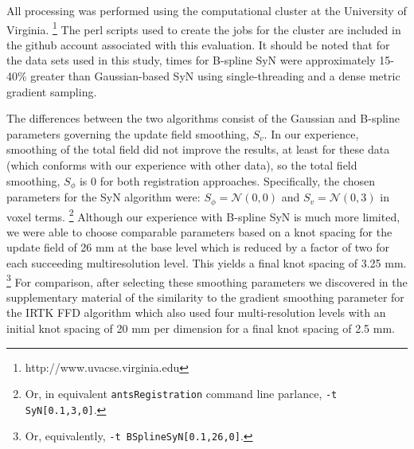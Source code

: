 \documentclass{frontiersSCNS}
\begin{document}
All processing was performed using the computational cluster at the 
University of Virginia.%
\footnote{
http://www.uvacse.virginia.edu
}
The perl scripts used to create the jobs for the cluster are
included in the github account associated with this evaluation.  
It should be noted that for the
data sets used in this study, times for B-spline SyN were approximately 
15-40\% greater than Gaussian-based SyN using single-threading and a dense
metric gradient sampling.

The differences between the two algorithms consist of the Gaussian and 
B-spline parameters governing the update field smoothing, $S_v$.  In our 
experience, smoothing of the total field did not improve the results, at
least for these data (which conforms with our experience with other
data), so the total field smoothing, $S_{\phi}$ is 0 for
both registration approaches.  Specifically, the chosen parameters
for the SyN algorithm were:  $S_{\phi} = \mathcal{N}(0,0)$ and 
$S_{v} = \mathcal{N}(0,3)$ in voxel terms.%
\footnote{
 Or, in equivalent {\tt antsRegistration} command line parlance, {\tt -t
 SyN[0.1,3,0]}.
 }  Although our experience with B-spline SyN is much more limited, we 
were able to choose comparable parameters based on a knot spacing
for the update field of 26 mm at the base level which is reduced by
a factor of two for each succeeding multiresolution level.  This 
yields a final knot spacing of 3.25 mm.%
\footnote{
 Or, equivalently, {\tt -t
 BSplineSyN[0.1,26,0]}.
 }
For comparison, after selecting these smoothing parameters we discovered 
in the supplementary material of \cite{klein2009} the similarity to the 
gradient smoothing parameter for the IRTK FFD algorithm
which also used four multi-resolution levels with an initial knot spacing of
20 mm per dimension for a final knot spacing of 2.5 mm.  
\end{document}
